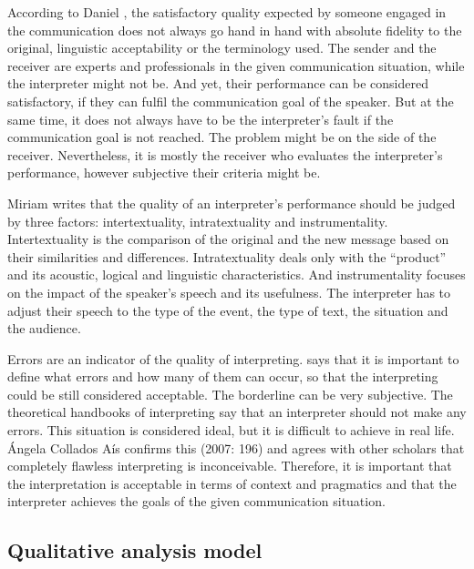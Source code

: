 \documentclass[output=paper]{langscibook}
\begin{document}
According to Daniel \citet[37]{Gile2009}, the satisfactory quality expected by someone engaged in the communication does not always go hand in hand with absolute fidelity to the original, linguistic acceptability or the terminology used. The sender and the receiver are experts and professionals in the given communication situation, while the interpreter might not be. And yet, their performance can be considered satisfactory, if they can fulfil the communication goal of the speaker. But at the same time, it does not always have to be the interpreter’s fault if the communication goal is not reached. The problem might be on the side of the receiver. Nevertheless, it is mostly the receiver who evaluates the interpreter’s performance, however subjective their criteria might be.

Miriam \citet[128]{ShlesingerEtAl1997} writes that the quality of an interpreter's performance should be judged by three factors: intertextuality, intratextuality and instrumentality. Intertextuality is the comparison of the original and the new message based on their similarities and differences. Intratextuality deals only with the “product” and its acoustic, logical and linguistic characteristics. And instrumentality focuses on the impact of the speaker’s speech and its usefulness. The interpreter has to adjust their speech to the type of the event, the type of text, the situation and the audience.

Errors are an indicator of the quality of interpreting. \citet[68]{Kopczyński1980} says that it is important to define what errors and how many of them can occur, so that the interpreting could be still considered acceptable. The borderline can be very subjective. The theoretical handbooks of interpreting say that an interpreter should not make any errors. This situation is considered ideal, but it is difficult to achieve in real life. Ángela Collados Aís confirms this (2007: 196) and agrees with other scholars that completely flawless interpreting is inconceivable. Therefore, it is important that the interpretation is acceptable in terms of context and pragmatics and that the interpreter achieves the goals of the given communication situation.

\subsection{Qualitative analysis model}\label{sec:kloudova:3.3}
\end{document}
